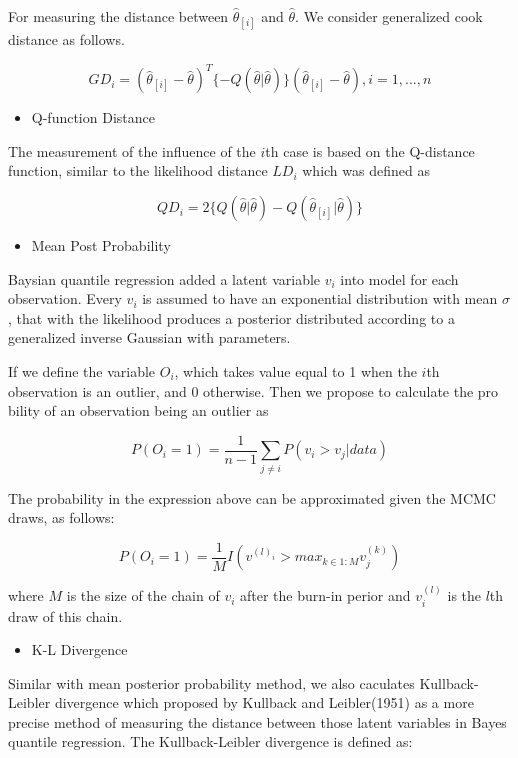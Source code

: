 \documentclass[11pt,a4paper,]{article}
\providecommand{\tightlist}{%
  \setlength{\itemsep}{0pt}\setlength{\parskip}{0pt}}
\theoremstyle{definition}
\theoremstyle{definition}
\theoremstyle{remark}
\begin{document}
For measuring the distance between \(\hat{\theta}_{[i]}\) and
\(\hat{\theta}\). We consider generalized cook distance as follows.

\[GD_{i} =(\hat{\theta}_{[i]}-\hat{\theta})^{T}\{-Q(\hat{\theta}|\hat{\theta})\}(\hat{\theta}_{[i]}-\hat{\theta}), i=1,...,n\]

\begin{itemize}
\tightlist
\item
  Q-function Distance
\end{itemize}

The measurement of the influence of the \(i\)th case is based on the
Q-distance function, similar to the likelihood distance \(LD_{i}\) which
was defined as

\[QD_{i}=2\{Q(\hat{\theta}|\hat{\theta})-Q(\hat{\theta}_{[i]}|\hat{\theta})\}\]

\begin{itemize}
\tightlist
\item
  Mean Post Probability
\end{itemize}

Baysian quantile regression added a latent variable \(v_i\) into model
for each observation. Every \(v_i\) is assumed to have an exponential
distribution with mean \(\sigma\), that with the likelihood produces a
posterior distributed according to a generalized inverse Gaussian with
parameters.

If we define the variable \(O_i\), which takes value equal to 1 when the
\(i\)th observation is an outlier, and 0 otherwise. Then we propose to
calculate the pro bility of an observation being an outlier as

\[P(O_i=1)=\frac{1}{n-1}\sum_{j \neq i}P(v_i > v_j|data)\]

The probability in the expression above can be approximated given the
MCMC draws, as follows:

\[P(O_i = 1)=\frac{1}{M}I(v^{(l)_i}>max_{k \in 1:M}v^{(k)}_j)\]

where \(M\) is the size of the chain of \(v_i\) after the burn-in perior
and \(v^{(l)}_i\) is the \(l\)th draw of this chain.

\begin{itemize}
\tightlist
\item
  K-L Divergence
\end{itemize}

Similar with mean posterior probability method, we also caculates
Kullback-Leibler divergence which proposed by Kullback and Leibler(1951)
as a more precise method of measuring the distance between those latent
variables in Bayes quantile regression. The Kullback-Leibler divergence
is defined as:
\end{document}
